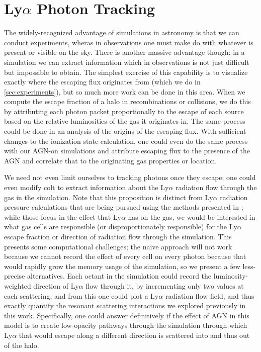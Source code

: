 \section{Ly$\alpha$ Photon Tracking}
The widely-recognized advantage of simulations in astronomy is that we can conduct experiments, wheras in observations one must make do with whatever is present or visible on the sky.
There is another massive advantage though; in a simulation we can extract information which in observations is not just difficult but impossible to obtain.
The simplest exercise of this capability is to visualize exactly where the escaping flux originates from (which we do in \ref{sec:experiments}), but so much more work can be done in this area.
When we compute the escape fraction of a halo in recombinations or collisions, we do this by attributing each photon packet proportionally to the escape of each source based on the relative luminosities of the gas it originates in.
The same process could be done in an analysis of the origins of the escaping flux.
With sufficient changes to the ionization state calculation, one could even do the same process with our AGN-on simulations and attribute escaping flux to the presence of the AGN and correlate that to the originating gas properties or location.

We need not even limit ourselves to tracking photons once they escape; one could even modify {\sc colt} to extract information about the Ly$\alpha$ radiation flow through the gas in the simulation.
Note that this proposition is distinct from Ly$\alpha$ radiation pressure calculations that are being pursued using the methods presented in \citet{Smith2018}; while those focus in the effect that Ly$\alpha$ has on the gas, we would be interested in what gas cells are responsible (or disproportionately responsible) for the Ly$\alpha$ escape fraction or direction of radiation flow through the simulation.
This presents some computational challenges; the naive approach will not work because we cannot record the effect of every cell on every photon because that would rapidly grow the memory usage of the simulation, so we present a few less-precise alternatives.
Each octant in the simulation could record the luminosity-weighted direction of Ly$\alpha$ flow through it, by incrementing only two values at each scattering, and from this one could plot a Ly$\alpha$ radiation flow field, and thus exactly quantify the resonant scattering interactions we explored previously in this work.
Specifically, one could answer definitively if the effect of AGN in this model is to create low-opacity pathways through the simulation through which Ly$\alpha$ that would escape along a different direction is scattered into and thus out of the halo.


